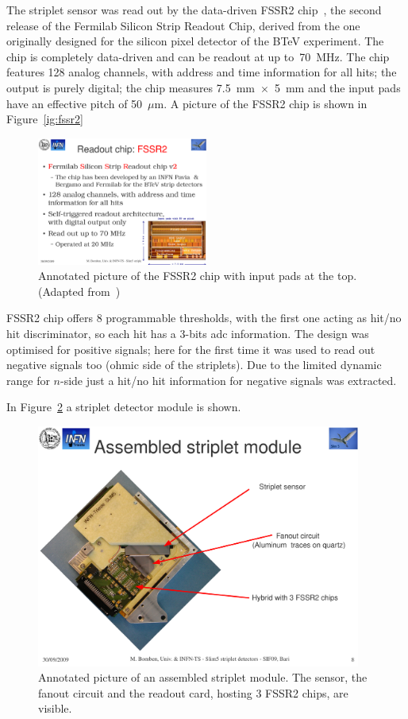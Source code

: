 The striplet sensor was read out by the data-driven FSSR2 chip~\cite{Re:2006zw}, 
the second release of the Fermilab Silicon Strip Readout Chip, derived from the one originally designed 
for the silicon pixel detector of the BTeV experiment. The chip is completely data-driven and can be 
readout at up to~70~MHz. The chip features 128 analog channels, with address and time information 
for all hits; the output is purely digital; the chip measures 7.5~mm~$\times$~5~mm and the input pads have an effective pitch of 50~$\mu$m. A picture of the FSSR2 chip is shown in Figure~\ref{ig:fssr2}


\begin{figure}[!htpb]
\centering
\includegraphics[width=0.5\textwidth]{fssr2.pdf}
\caption{\label{fig:fssr2}Annotated picture of the FSSR2 chip with input pads at the top. (Adapted from~\cite{Re:2006zw})}
\end{figure}


FSSR2 chip offers 8 programmable thresholds, with the first one acting as hit/no hit discriminator, 
so each hit has a 3-bits adc information. The design was optimised for positive signals; 
here for the first time it was used to read out negative signals too (ohmic side of the striplets). 
Due to the limited dynamic range for $n$-side just a hit/no hit information for negative signals was 
extracted.

In Figure~\ref{fig:assembled_striplets} a striplet detector module is shown.

\begin{figure}[!htpb]
\centering
\includegraphics[width=0.95\textwidth]{assembeld_striplets.pdf}
\caption{\label{fig:assembled_striplets}Annotated picture of an assembled striplet module. The 
sensor, the fanout circuit and the readout card, hosting 3 FSSR2 chips, are visible.}
\end{figure}

